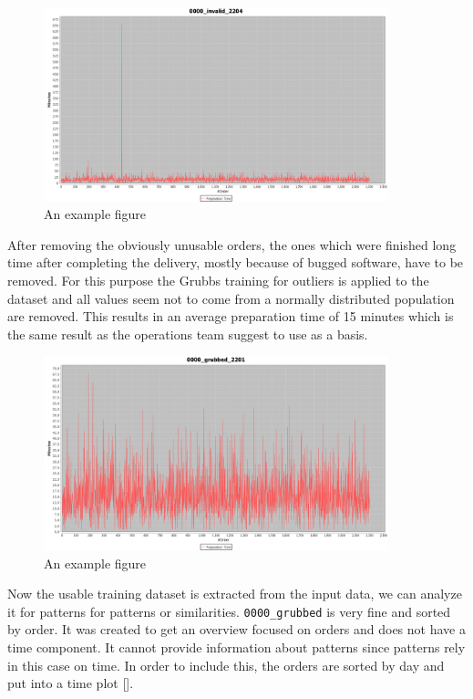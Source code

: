 \begin{figure}[h]
\begin{center}
\includegraphics[width=10cm]{images/0000_invalid_2204.png}
\caption{An example figure}
\label{fig:example}
\end{center}
\end{figure}

After removing the obviously unusable orders, the ones which were finished long time after completing the delivery, mostly because of bugged software, have to be removed. For this purpose the Grubbs training for outliers is applied to the dataset and all values seem not to come from a normally distributed population are removed. This results in an average preparation time of 15 minutes which is the same result as the operations team suggest to use as a basis.

\begin{figure}[h]
\begin{center}
\includegraphics[width=10cm]{images/0000_grubbed_2201.png}
\caption{An example figure}
\label{fig:example}
\end{center}
\end{figure}

Now the usable training dataset is extracted from the input data, we can analyze it for patterns for patterns or similarities.\newline
\texttt{0000\_grubbed} is very fine and sorted by order. It was created to get an overview focused on orders and does not have a time component. It cannot provide information about patterns since patterns rely in this case on time. In order to include this, the orders are sorted by day and put into a time plot [].

